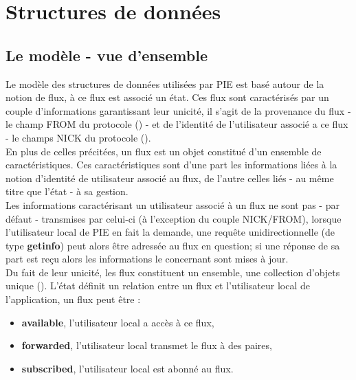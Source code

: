 

\section{Structures de données}
\label{section:storage}

\subsection{Le modèle - vue d'ensemble}

Le modèle des structures de données utilisées par PIE est basé autour de la notion de
flux, à ce flux est associé un état. Ces flux sont caractérisés par un couple d'informations
garantissant leur unicité, il s'agit de la provenance du flux - le champ FROM du protocole
() - et de l'identité de l'utilisateur associé a ce flux - le champs NICK
du protocole ().\\

En plus de celles précitées, un flux est un objet constitué d'un ensemble de caractéristiques.
Ces caractéristiques sont d'une part les informations liées à la notion d'identité de utilisateur
associé au flux, de l'autre celles liés - au même titre que l'état - à sa gestion. \\

Les informations caractérisant un utilisateur associé à un flux ne sont pas - par défaut -
transmises par celui-ci (à l'exception du couple NICK/FROM), lorsque 
l'utilisateur local de PIE en fait la demande, une requête unidirectionnelle (de type \textbf{getinfo})
peut alors être adressée au flux en question; si une réponse de sa part est reçu alors
les informations le concernant sont mises à jour. \\

Du fait de leur unicité, les flux constituent un ensemble, une collection d'objets unique ().
L'état définit un relation entre un flux et l'utilisateur local de l'application, un flux
peut être : \\

\begin{itemize}
	\item \textbf{available}, l'utilisateur local a accès à ce flux,
    \item \textbf{forwarded}, l'utilisateur local transmet le flux à des paires,
    \item \textbf{subscribed}, l'utilisateur local est abonné au flux. \\
\end{itemize}


